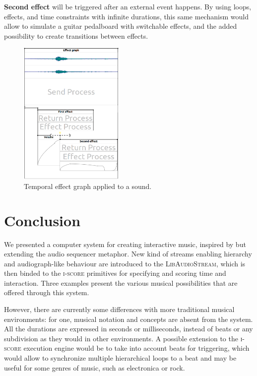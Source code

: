 \documentclass{article}
\newcommand*{\LibAudioStream}{\textsc{LibAudioStream}\xspace}
\newcommand*{\iscore}{\textsc{i-score}\xspace}
\begin{document}
\textbf{Second effect} will be triggered after an external event happens.
By using loops, effects, and time constraints with infinite durations, this same mechanism would allow to simulate a guitar pedalboard with switchable effects, and the added possibility to create transitions between effects.

\begin{figure}[h]
    \centering
    \includegraphics[width=0.45\textwidth]{figures/ex3.png}
    \caption{Temporal effect graph applied to a sound.}
    \label{fig.score3}
\end{figure}

\section{Conclusion}
We presented a computer system for creating interactive music, inspired 
by but extending the audio sequencer metaphor.
New kind of streams enabling hierarchy and audiograph-like behaviour are introduced to the \LibAudioStream, which is then binded to the \iscore primitives for specifying and scoring time and interaction.
Three examples present the various musical possibilities that are offered
through this system.

However, there are currently some differences with more traditional musical environments: for one, musical notation and concepts are absent from the system.
All the durations are expressed in seconds or milliseconds, instead of beats or any subdivision as they would in other environments. 
A possible extension to the \iscore execution engine would be to take into account beats for triggering, which would allow to synchronize multiple hierarchical loops to a beat and may be useful for some genres of music, such as electronica or rock.
\end{document}
